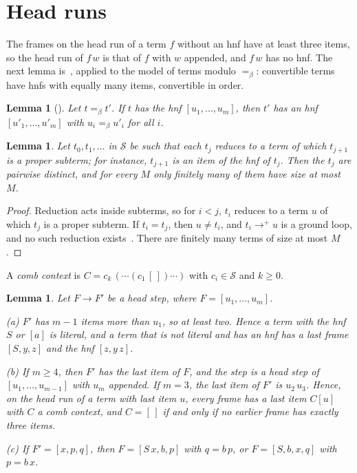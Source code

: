 \documentclass[11pt]{amsart}
\newtheorem{lemma}[theorem]{Lemma}
\newcommand{\Ter}{\mathcal S}
\newcommand{\conv}{=_\beta}
\newcommand{\fr}[1]{[#1]}
\begin{document}
\section{Head runs}\label{sec:runs}

The frames on the head run of a term $f$ without an hnf have at least three items, so the head run
of $f\,w$ is that of $f$ with $w$ appended, and $f\,w$ has no hnf. The next lemma
is~\citep[Lemma~4]{s6}, applied to the model of terms modulo $\conv$: convertible terms have
hnfs with equally many items, convertible in order.

\begin{lemma}[\citep{s6}]\label{lem:invariant}
Let $t\conv t'$. If $t$ has the hnf $\fr{u_1,\dots,u_m}$, then $t'$ has an hnf $\fr{u'_1,\dots,u'_m}$
with $u_i\conv u'_i$ for all $i$.
\end{lemma}

\begin{lemma}\label{lem:distinct}
Let $t_0,t_1,\dots$ in $\Ter$ be such that each $t_j$ reduces to a term of which $t_{j+1}$ is a
proper subterm; for instance, $t_{j+1}$ is an item of the hnf of $t_j$. Then the $t_j$ are pairwise
distinct, and for every $M$ only finitely many of them have size at most $M$.
\end{lemma}

\begin{proof}
Reduction acts inside subterms, so for $i<j$, $t_i$ reduces to a term $u$ of which $t_j$ is a
proper subterm. If $t_i=t_j$, then $u\ne t_i$, and $t_i\to^+u$ is a ground loop, and no such reduction
exists~\citep{waldmann-ic,s7}. There are finitely many terms of size at most $M$.
\end{proof}

A \emph{comb context} is $C=c_k\,(\cdots(c_1\,[\,])\cdots)$ with $c_i\in\Ter$ and $k\ge0$.

\begin{lemma}\label{lem:frames}
Let $F\to F'$ be a head step, where $F=\fr{u_1,\dots,u_m}$.

\textup{(a)} $F'$ has $m-1$ items more than $u_1$, so at least two. Hence a term with the hnf $S$ or
  $\fr{a}$ is literal, and a term that is not literal and has an hnf has a last frame $\fr{S,y,z}$
  and the hnf $\fr{z,y\,z}$.

\textup{(b)} If $m\ge4$, then $F'$ has the last item of $F$, and the step is a head step of
  $\fr{u_1,\dots,u_{m-1}}$ with $u_m$ appended. If $m=3$, the last item of $F'$ is $u_2\,u_3$. Hence,
  on the head run of a term with last item $u$, every frame has a last item $C[u]$ with $C$ a comb
  context, and $C=[\,]$ if and only if no earlier frame has exactly three items.

\textup{(c)} If $F'=\fr{x,p,q}$, then $F=\fr{S\,x,b,p}$ with $q=b\,p$, or $F=\fr{S,b,x,q}$ with $p=b\,x$.
\end{lemma}
\end{document}
